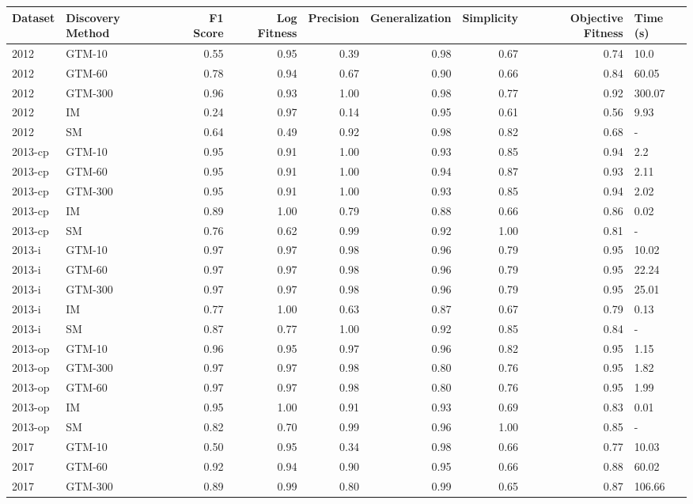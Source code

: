 \begin{tabular}{llrrrrrrl}
\toprule
Dataset & Discovery Method & F1 Score & Log Fitness & Precision & Generalization & Simplicity & Objective Fitness & Time (s) \\
\midrule
2012 & GTM-10 & 0.55 & 0.95 & 0.39 & 0.98 & 0.67 & 0.74 & 10.0 \\
2012 & GTM-60 & 0.78 & 0.94 & 0.67 & 0.90 & 0.66 & 0.84 & 60.05 \\
2012 & GTM-300 & 0.96 & 0.93 & 1.00 & 0.98 & 0.77 & 0.92 & 300.07 \\
2012 & IM & 0.24 & 0.97 & 0.14 & 0.95 & 0.61 & 0.56 & 9.93 \\
2012 & SM & 0.64 & 0.49 & 0.92 & 0.98 & 0.82 & 0.68 & - \\
2013-cp & GTM-10 & 0.95 & 0.91 & 1.00 & 0.93 & 0.85 & 0.94 & 2.2 \\
2013-cp & GTM-60 & 0.95 & 0.91 & 1.00 & 0.94 & 0.87 & 0.93 & 2.11 \\
2013-cp & GTM-300 & 0.95 & 0.91 & 1.00 & 0.93 & 0.85 & 0.94 & 2.02 \\
2013-cp & IM & 0.89 & 1.00 & 0.79 & 0.88 & 0.66 & 0.86 & 0.02 \\
2013-cp & SM & 0.76 & 0.62 & 0.99 & 0.92 & 1.00 & 0.81 & - \\
2013-i & GTM-10 & 0.97 & 0.97 & 0.98 & 0.96 & 0.79 & 0.95 & 10.02 \\
2013-i & GTM-60 & 0.97 & 0.97 & 0.98 & 0.96 & 0.79 & 0.95 & 22.24 \\
2013-i & GTM-300 & 0.97 & 0.97 & 0.98 & 0.96 & 0.79 & 0.95 & 25.01 \\
2013-i & IM & 0.77 & 1.00 & 0.63 & 0.87 & 0.67 & 0.79 & 0.13 \\
2013-i & SM & 0.87 & 0.77 & 1.00 & 0.92 & 0.85 & 0.84 & - \\
2013-op & GTM-10 & 0.96 & 0.95 & 0.97 & 0.96 & 0.82 & 0.95 & 1.15 \\
2013-op & GTM-300 & 0.97 & 0.97 & 0.98 & 0.80 & 0.76 & 0.95 & 1.82 \\
2013-op & GTM-60 & 0.97 & 0.97 & 0.98 & 0.80 & 0.76 & 0.95 & 1.99 \\
2013-op & IM & 0.95 & 1.00 & 0.91 & 0.93 & 0.69 & 0.83 & 0.01 \\
2013-op & SM & 0.82 & 0.70 & 0.99 & 0.96 & 1.00 & 0.85 & - \\
2017 & GTM-10 & 0.50 & 0.95 & 0.34 & 0.98 & 0.66 & 0.77 & 10.03 \\
2017 & GTM-60 & 0.92 & 0.94 & 0.90 & 0.95 & 0.66 & 0.88 & 60.02 \\
2017 & GTM-300 & 0.89 & 0.99 & 0.80 & 0.99 & 0.65 & 0.87 & 106.66 \\

\end{tabular}
